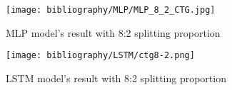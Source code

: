 \documentclass{ieeeojies}
\begin{document}
\begin{figure}[H]
  \centering
  \begin{minipage}{0.8\linewidth}
    \centering
    \texttt{[image: bibliography/MLP/MLP\_8\_2\_CTG.jpg]}
    \caption{MLP model's result with 8:2 splitting proportion}
    \label{fig22}
  \end{minipage}
\end{figure}
\begin{figure}[H]
  \centering
  \begin{minipage}{0.8\linewidth}
    \centering
    \texttt{[image: bibliography/LSTM/ctg8-2.png]}
    \caption{LSTM model's result with 8:2 splitting proportion}
    \label{fig22}
  \end{minipage}
\end{figure}
\end{document}
